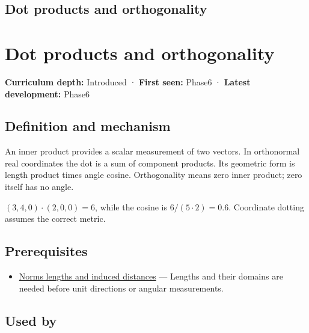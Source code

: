 \hypertarget{appendix-8bc4e8fc547c}{}
\section*{Dot products and orthogonality}
\chapter{Dot products and orthogonality}\label{appendix-8bc4e8fc547c-dot-products-and-orthogonality}

\textbf{Curriculum depth:} Introduced · \textbf{First seen:} Phase6 · \textbf{Latest development:} Phase6

\section{Definition and mechanism}\label{appendix-8bc4e8fc547c-definition-and-mechanism}

An inner product provides a scalar measurement of two vectors. In orthonormal real coordinates the dot is a sum of component products. Its geometric form is length product times angle cosine. Orthogonality means zero inner product; zero itself has no angle.

\((3,4,0)\cdot(2,0,0)=6\), while the cosine is \(6/(5\cdot2)=0.6\). Coordinate dotting assumes the correct metric.

\section{Prerequisites}\label{appendix-8bc4e8fc547c-prerequisites}

\begin{itemize}
\tightlist
\item
  \hyperref[appendix-49933872bb51]{Norms lengths and induced distances} --- Lengths and their domains are needed before unit directions or angular measurements.
\end{itemize}

\section{Used by}\label{appendix-8bc4e8fc547c-used-by}

